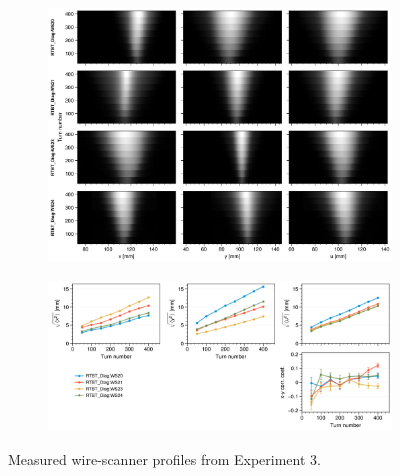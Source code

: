 \begin{figure}[!p]
    \centering
    \begin{subfigure}{\textwidth}
        \includegraphics[width=\textwidth]{Images/chapter5/exp3/waterfall.png}
    \end{subfigure}
    \vfill
    \vspace*{1.25cm}
    \vfill
    \begin{subfigure}{\textwidth}
        \includegraphics[width=\textwidth]{Images/chapter5/exp3/rms.png}
    \end{subfigure}
    \caption{Measured wire-scanner profiles from Experiment 3.}
    \label{fig:exp3_wsmeas}
\end{figure}
%
%
